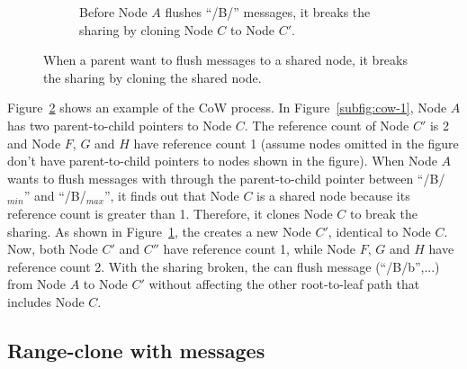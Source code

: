 \begin{figure}
\begin{subfigure}{\textwidth}
        \caption{\label{subfig:cow-2} Before Node $A$ flushes ``/B/'' messages,
            it breaks the sharing by cloning Node $C$ to Node $C'$.}
    \end{subfigure}
    \caption[\bedags break node sharing with CoW]{\label{fig:cow}
        When a parent want to flush messages to a shared node,
        it breaks the sharing by cloning the shared node.}
\end{figure}

Figure~\ref{fig:cow} shows an example of the CoW process.
In Figure~\ref{subfig:cow-1}, Node $A$ has two parent-to-child pointers to
Node $C$.
The reference count of Node $C'$ is 2 and
Node $F$, $G$ and $H$ have reference count 1
(assume nodes omitted in the figure don't have parent-to-child pointers
to nodes shown in the figure).
When Node $A$ wants to flush messages with through the parent-to-child pointer
between ``/B/$_{min}$'' and ``/B/$_{max}$'',
it finds out that Node $C$ is a shared node because its reference count is
greater than 1.
Therefore, it clones Node $C$ to break the sharing.
As shown in Figure~\ref{subfig:cow-2}, the \bedag creates a new Node $C'$,
identical to Node $C$.
Now, both Node $C'$ and $C''$ have reference count 1, while Node $F$, $G$ and
$H$ have reference count 2.
With the sharing broken, the \bedag can flush message \putm(``/B/b'',...) from
Node $A$ to Node $C'$ without affecting the other root-to-leaf path that
includes Node $C$.

\subsection{Range-clone with \goto messages}
\label{sec:rc:goto}

